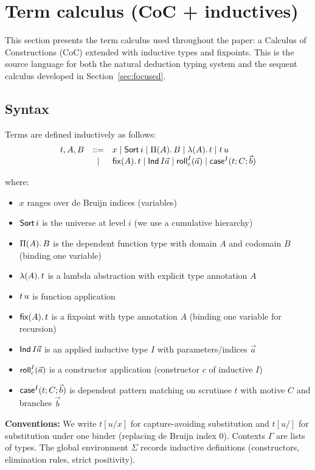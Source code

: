 \section{Term calculus (CoC + inductives)}
\label{sec:calculus}

This section presents the term calculus used throughout the paper: a Calculus of Constructions (CoC) extended with inductive types and fixpoints. This is the source language for both the natural deduction typing system and the sequent calculus developed in Section~\ref{sec:focused}.

\subsection{Syntax}

Terms are defined inductively as follows:
\[
\begin{array}{rcl}
t, A, B &::=& x \mid \mathsf{Sort}\,i \mid \Pi(A).\,B \mid \lambda(A).\,t \mid t\,u \\
        &\mid& \mathsf{fix}(A).\,t \mid \mathsf{Ind}\,I{\vec{a}} \mid \mathsf{roll}^{I}_{c}(\vec{a}) \mid \mathsf{case}^{I}(t;C;\vec{b})
\end{array}
\]

\noindent where:
\begin{itemize}[leftmargin=2em]
\item $x$ ranges over de Bruijn indices (variables)
\item $\mathsf{Sort}\,i$ is the universe at level $i$ (we use a cumulative hierarchy)
\item $\Pi(A).\,B$ is the dependent function type with domain $A$ and codomain $B$ (binding one variable)
\item $\lambda(A).\,t$ is a lambda abstraction with explicit type annotation $A$
\item $t\,u$ is function application
\item $\mathsf{fix}(A).\,t$ is a fixpoint with type annotation $A$ (binding one variable for recursion)
\item $\mathsf{Ind}\,I{\vec{a}}$ is an applied inductive type $I$ with parameters/indices $\vec{a}$
\item $\mathsf{roll}^{I}_{c}(\vec{a})$ is a constructor application (constructor $c$ of inductive $I$)
\item $\mathsf{case}^{I}(t;C;\vec{b})$ is dependent pattern matching on scrutinee $t$ with motive $C$ and branches $\vec{b}$
\end{itemize}

\noindent\textbf{Conventions:}
We write $t[u/x]$ for capture-avoiding substitution and $t[u/]$ for substitution under one binder (replacing de Bruijn index 0).
Contexts $\Gamma$ are lists of types. The global environment $\Sigma$ records inductive definitions (constructors, elimination rules, strict positivity).

